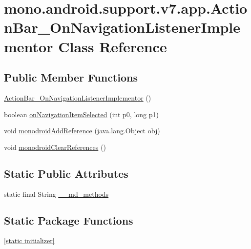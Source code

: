 \hypertarget{classmono_1_1android_1_1support_1_1v7_1_1app_1_1_action_bar___on_navigation_listener_implementor}{
\section{mono.android.support.v7.app.ActionBar\_\-OnNavigationListenerImplementor Class Reference}
\label{classmono_1_1android_1_1support_1_1v7_1_1app_1_1_action_bar___on_navigation_listener_implementor}
}
\subsection*{Public Member Functions}
\begin{CompactItemize}
\item 
\hyperlink{classmono_1_1android_1_1support_1_1v7_1_1app_1_1_action_bar___on_navigation_listener_implementor_4729a43ecf3aeace36396b9eb52f83c9}{ActionBar\_\-OnNavigationListenerImplementor} ()
\item 
boolean \hyperlink{classmono_1_1android_1_1support_1_1v7_1_1app_1_1_action_bar___on_navigation_listener_implementor_a8e79b4e1839807bbcb095ce88841c8d}{onNavigationItemSelected} (int p0, long p1)
\item 
void \hyperlink{classmono_1_1android_1_1support_1_1v7_1_1app_1_1_action_bar___on_navigation_listener_implementor_b81ccc974aea244bca8ff1bd961c7f3d}{monodroidAddReference} (java.lang.Object obj)
\item 
void \hyperlink{classmono_1_1android_1_1support_1_1v7_1_1app_1_1_action_bar___on_navigation_listener_implementor_36832b5ba4a1ccf95e0e38fe4cab8587}{monodroidClearReferences} ()
\end{CompactItemize}
\subsection*{Static Public Attributes}
\begin{CompactItemize}
\item 
static final String \hyperlink{classmono_1_1android_1_1support_1_1v7_1_1app_1_1_action_bar___on_navigation_listener_implementor_ce41bbd5e877c139f623cae4ca078214}{\_\-\_\-md\_\-methods}
\end{CompactItemize}
\subsection*{Static Package Functions}
\begin{CompactItemize}
\item 
\hyperlink{classmono_1_1android_1_1support_1_1v7_1_1app_1_1_action_bar___on_navigation_listener_implementor_89165133efeee8fac125c0a3092e1623}{\mbox{[}static initializer\mbox{]}}
\end{CompactItemize}
